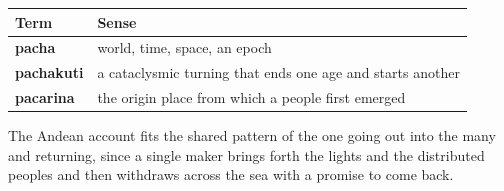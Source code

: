 \begin{longtable}{@{}
ll@{}}
\toprule
Term & Sense \\
\midrule
\textbf{pacha} & world, time, space, an epoch \\
\textbf{pachakuti} & a cataclysmic turning that ends one age and starts another \\
\textbf{pacarina} & the origin place from which a people first emerged \\
\bottomrule
\end{longtable}

The Andean account fits the shared pattern of the one going out into the many and returning, since a single maker brings forth the lights and the distributed peoples and then withdraws across the sea with a promise to come back.
